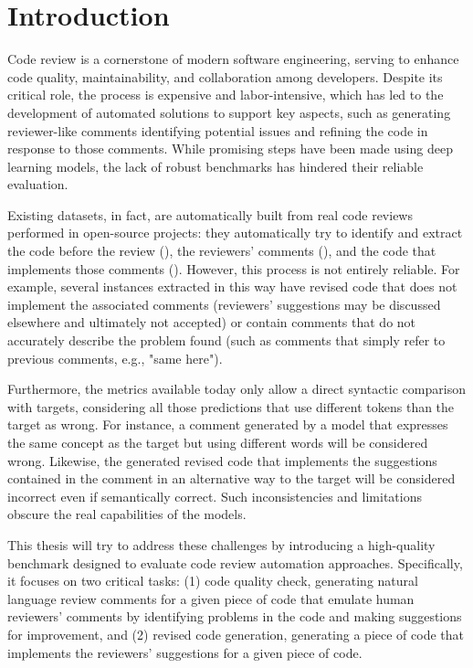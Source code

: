 \section{Introduction}
Code review is a cornerstone of modern software engineering, serving to enhance
code quality, maintainability, and collaboration among developers. Despite its critical
role, the process is expensive and labor-intensive, which has led to the development
of automated solutions to support key aspects, such as generating reviewer-like
comments identifying potential issues and refining the code in response to those comments.
While promising steps have been made using deep learning models, the lack of robust
benchmarks has hindered their reliable evaluation.

Existing datasets, in fact, are automatically built from real code reviews
performed in open-source projects: they automatically try to identify and
extract the code before the review (\subCode), the reviewers' comments
(\revComment), and the code that implements those comments (\revCode). However,
this process is not entirely reliable. For example, several instances extracted
in this way have revised code that does not implement the associated comments
(reviewers' suggestions may be discussed elsewhere and ultimately not accepted)
or contain comments that do not accurately describe the problem found (such as
comments that simply refer to previous comments, e.g., "same here").

Furthermore, the metrics available today only allow a direct syntactic comparison with targets,
considering all those predictions that use different tokens than the target as wrong. For instance,
a comment generated by a model that expresses the same concept as the target but using
different words will be considered wrong. Likewise, the generated revised code that implements
the suggestions contained in the comment in an alternative way to the target will be considered
incorrect even if semantically correct.
Such inconsistencies and limitations obscure the real capabilities of the models.


This thesis will try to address these challenges by introducing a high-quality
benchmark designed to evaluate code review automation approaches.
Specifically, it focuses on two critical tasks: (1) code quality check, \ie
generating natural language review comments for a given piece of code that emulate
human reviewers' comments by identifying problems in the code and making suggestions
for improvement, and (2) revised code generation, \ie generating a piece of code that
implements the reviewers' suggestions for a given piece of code.

